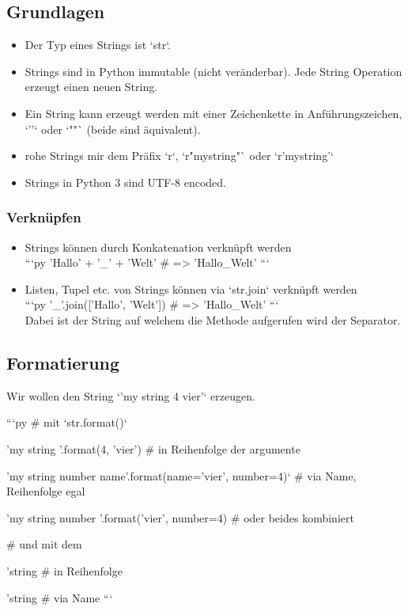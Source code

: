 \subsection{Grundlagen}
\begin{itemize}
    \item Der Typ eines Strings ist `str`.
    \item Strings sind in Python immutable (nicht veränderbar). Jede String Operation erzeugt einen neuen String.
    \item Ein String kann erzeugt werden mit einer Zeichenkette in Anführungszeichen, `''` oder `""` (beide sind äquivalent).
    \item rohe Strings mir dem Präfix `r`, `r"mystring"` oder `r'mystring'`
    \item Strings in Python 3 sind UTF-8 encoded.
\end{itemize}

\subsubsection{Verknüpfen}
\begin{itemize}
    \item Strings können durch Konkatenation verknüpft werden \\
    ```py
    'Hallo' + '_' + 'Welt' #  => 'Hallo_Welt'
    ```  
    \item Listen, Tupel etc. von Strings können via `str.join` verknüpft werden \\
    ```py
    '_'.join(['Hallo', 'Welt']) #  => 'Hallo_Welt'
    ```\\
    Dabei ist der String auf welchem die Methode aufgerufen wird der Separator.
\end{itemize}

\subsection{Formatierung}
Wir wollen den String `'my string 4 vier'` erzeugen.

```py
# mit `str.format()`  

'my string {} {}'.format(4, 'vier')
# in Reihenfolge der argumente

'my string {number} {name}'.format(name='vier', number=4)`
# via Name, Reihenfolge egal

'my string {number} {}'.format('vier', number=4)
# oder beides kombiniert


# und mit dem %

'string %
# in Reihenfolge

'string %
# via Name
  ```

